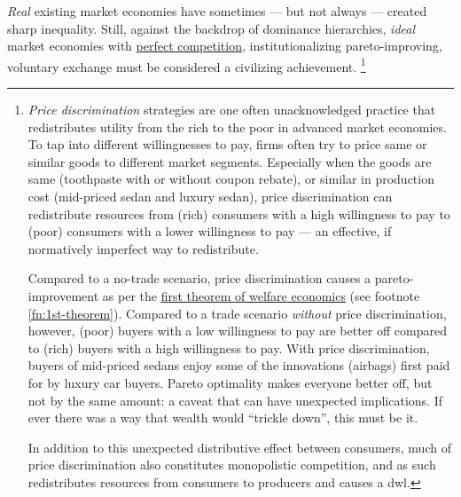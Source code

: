 \emph{Real} existing market economies have sometimes --- but not always --- created sharp inequality.
Still, against the backdrop of dominance hierarchies, \emph{ideal} market economies with \hyperref[sec:perfect-competition]{perfect competition}, institutionalizing pareto-improving, voluntary exchange must be considered a civilizing achievement.
\footnote{
	\emph{Price discrimination} strategies are one often unacknowledged practice that redistributes utility from the rich to the poor in advanced market economies.
	To tap into different willingnesses to pay, firms often try to price same or similar goods to different market segments.
	Especially when the goods are same (toothpaste with or without coupon rebate), or similar in production cost (mid-priced sedan and luxury sedan), price discrimination can redistribute resources from (rich) consumers with a high willingness to pay to (poor) consumers with a lower willingness to pay --- an effective, if normatively imperfect way to redistribute.

	Compared to a no-trade scenario, price discrimination causes a pareto-improvement as per the \hyperref[fn:1st-theorem]{first theorem of welfare economics} (see footnote \ref{fn:1st-theorem}).
	Compared to a trade scenario \emph{without} price discrimination, however, (poor) buyers with a low willingness to pay are better off compared to (rich) buyers with a high willingness to pay.
	With price discrimination, buyers of mid-priced sedans enjoy some of the innovations (airbags) first paid for by luxury car buyers.
	Pareto optimality makes everyone better off, but not by the same amount:
	a caveat that can have unexpected implications.
	If ever there was a way that wealth would ``trickle down'', this must be it.

	In addition to this unexpected distributive effect between consumers, much of price discrimination also constitutes monopolistic competition, and as such redistributes resources from consumers to producers and causes a \gls{dwl}.
}

